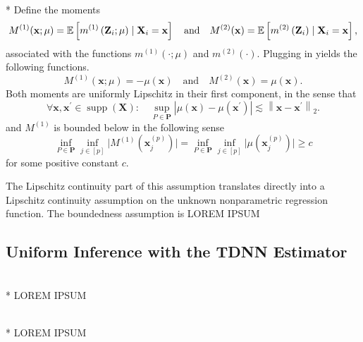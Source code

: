 \begin{boxD}
	\begin{asm}\mbox{}\\*
		Define the moments
		\begin{equation}
			M^{(1)}(\mathbf{x} ; \mu)
			= \mathbb{E}\left[m^{(1)}\left(\mathbf{Z}_i ; \mu\right) \mid \mathbf{X}_i= \mathbf{x}\right]
			\quad \text{and} \quad
			M^{(2)}(\mathbf{x})
			= \mathbb{E}\left[m^{(2)}\left(\mathbf{Z}_i\right) \mid \mathbf{X}_i = \mathbf{x}\right],
		\end{equation}
		associated with the functions $m^{(1)}(\cdot ; \mu)$ and $m^{(2)}(\cdot)$.
		Plugging in yields the following functions.
		\begin{equation}
			M^{(1)}(\mathbf{x} ; \mu)
			= -\mu(\mathbf{x})
			\quad \text{and} \quad
			M^{(2)}(\mathbf{x})
			= \mu(\mathbf{x}).
		\end{equation}
		Both moments are uniformly Lipschitz in their first component, in the sense that
		\begin{equation}
			\forall \mathbf{x}, \mathbf{x}^{\prime} \in \operatorname{supp}\left(\mathbf{X}\right): \quad
			\sup _{P \in \mathbf{P}}
			\left|\mu(\mathbf{x})-\mu\left(\mathbf{x}^{\prime}\right)\right|
			\lesssim\left\|\mathbf{x}-\mathbf{x}^{\prime}\right\|_{2}.
		\end{equation}
		and $M^{(1)}$ is bounded below in the following sense
		\begin{equation}
			\inf_{P \in \mathbf{P}} \inf_{j \in [p]} \Big|M^{(1)}\left(\mathbf{x}^{(p)}_{j}\right) \Big|
			= \inf_{P \in \mathbf{P}} \inf_{j \in [p]} \Big|\mu\left(\mathbf{x}^{(p)}_{j}\right) \Big| \geq c
		\end{equation}
		for some positive constant $c$.
	\end{asm}
\end{boxD}


The Lipschitz continuity part of this assumption translates directly into a Lipschitz continuity assumption on the unknown nonparametric regression function.
The boundedness assumption is
	{\color{red} LOREM IPSUM}

\subsection{Uniform Inference with the TDNN Estimator}
\begin{boxD}
	\begin{thm}\label{thm:unif_inf_TDNN}\mbox{}\\*
		{\color{red} LOREM IPSUM}
	\end{thm}
\end{boxD}

\begin{boxD}
	\begin{thm}\label{thm:unif_inf_TDNN_HTE}\mbox{}\\*
		{\color{red} LOREM IPSUM}
	\end{thm}
\end{boxD}
